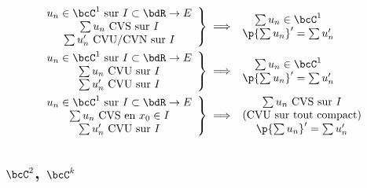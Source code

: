 \documentclass[a4paper,french,bookmarks]{book}
\begin{document}
    \begin{align*}
        \left.\begin{array}{c}
        u_n \in \bcC^1 \ \text{sur} \ I \subset \bdR \to E  \\
        \sum u_n \ \text{CVS sur} \ I\\
        \sum u_n' \ \text{CVU/CVN sur} \ I
    \end{array}\right\rbrace &\implies \begin{array}{c}
        \sum u_n \in \bcC^1\\
        \p{\sum u_n}' = \sum u_n'
    \end{array}\\
    \left.\begin{array}{c}
        u_n \in \bcC^1 \ \text{sur} \ I \subset \bdR \to E  \\
        \sum u_n \ \text{CVU sur} \ I\\
        \sum u_n' \ \text{CVU sur} \ I
    \end{array}\right\rbrace &\implies \begin{array}{c}
        \sum u_n \in \bcC^1\\
        \p{\sum u_n}' = \sum u_n'
    \end{array}\\
    \left.\begin{array}{c}
        u_n \in \bcC^1 \ \text{sur} \ I \subset \bdR \to E  \\
        \sum u_n \ \text{CVS en} \ x_0 \in I\\
        \sum u_n' \ \text{CVU sur} \ I
    \end{array}\right\rbrace &\implies \begin{array}{c}
        \sum u_n \ \text{CVS sur} \ I\\
        \text{(CVU sur tout compact)}\\
        \p{\sum u_n}' = \sum u_n'
    \end{array}
    \end{align*}
    
    \subsection{$\bcC^2$, $\bcC^k$}
    
\end{document}
